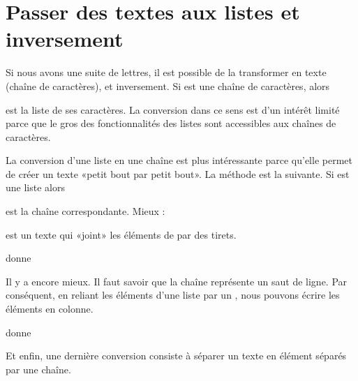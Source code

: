 \section{Passer des textes aux listes et inversement}

Si nous avons une suite de lettres, il est possible de la transformer en texte (chaîne de caractères), et inversement. Si  est une chaîne de caractères, alors
\begin{quote}
\end{quote}
est la liste de ses caractères. La conversion dans ce sens est d'un intérêt limité parce que le gros des fonctionnalités des listes sont accessibles aux chaînes de caractères.

La conversion d'une liste en une chaîne est plus intéressante parce qu'elle permet de créer un texte «petit bout par petit bout». La méthode est la suivante. Si  est une liste alors
\begin{quote}
\end{quote}
est la chaîne correspondante. Mieux : 
\begin{quote}
\end{quote}
est un texte qui «joint» les éléments de  par des tirets.





donne





Il y a encore mieux. Il faut savoir que la chaîne  représente un saut de ligne. Par conséquent, en reliant les éléments d'une liste par un , nous pouvons écrire les éléments en colonne. 



donne



Et enfin, une dernière conversion consiste à séparer un texte en élément séparés par une chaîne. 



